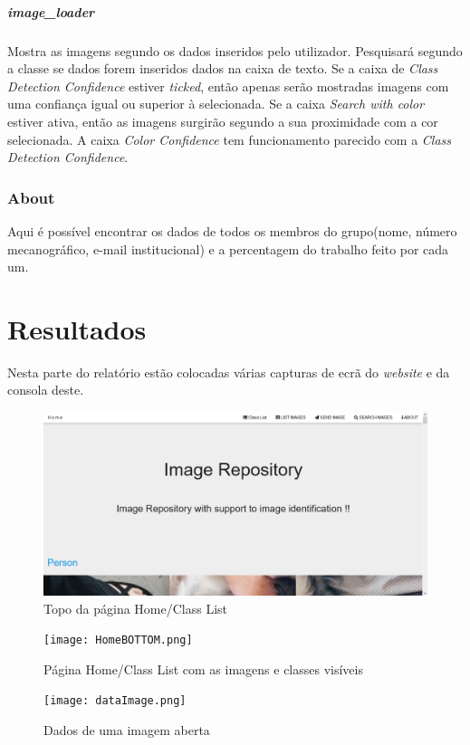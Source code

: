 \documentclass{report}
\begin{document}
\paragraph{image\_loader}
Mostra as imagens segundo os dados inseridos pelo utilizador. Pesquisará segundo a classe se dados forem inseridos dados na caixa de texto. Se a caixa de \textit{Class Detection Confidence} estiver \textit{ticked}, então apenas serão mostradas imagens com uma confiança igual ou superior à selecionada. Se a caixa \textit{Search with color} estiver ativa, então as imagens surgirão segundo a sua proximidade com a cor selecionada. A caixa \textit{Color Confidence} tem funcionamento parecido com a \textit{Class Detection Confidence}.

\subsection{About}
Aqui é possível encontrar os dados de todos os membros do grupo(nome, número mecanográfico, e-mail institucional) e a percentagem do trabalho feito por cada um.


\chapter{Resultados}
\label{chap.resultados}
Nesta parte do relatório estão colocadas várias capturas de ecrã do \textit{website} e da consola deste.
\begin{figure}[h]
\includegraphics[width=\textwidth]{HomeTOP.png}
\caption{Topo da página Home/Class List}
\label{Fig1}
\end{figure}

\begin{figure}[h]
\texttt{[image: HomeBOTTOM.png]}
\caption{Página Home/Class List com as imagens e classes visíveis}
\label{Fig2}
\end{figure}

\begin{figure}[h]
\texttt{[image: dataImage.png]}
\caption{Dados de uma imagem aberta}
\label{Fig3}
\end{figure}
\end{document}
